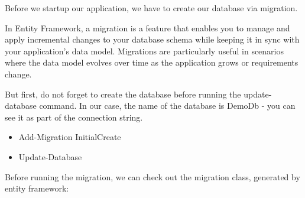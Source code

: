 Before we startup our application, we have to create our database via migration.

In Entity Framework, a migration is a feature that enables you to manage and apply incremental changes to your database schema while keeping it in sync with your application's data model. Migrations are particularly useful in scenarios where the data model evolves over time as the application grows or requirements change.

But first, do not forget to create the database before running the update-database command. In our case, the name of the database is DemoDb - you can see it as part of the connection string.

\begin{itemize}
\item Add-Migration InitialCreate

\item Update-Database
\end{itemize}

Before running the migration, we can check out the migration class, generated by entity framework:

